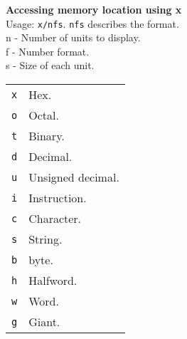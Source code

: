 \textbf{Accessing memory location using x}\\
Usage: \texttt{x/nfs}. \texttt{nfs} describes the format.\\
n - Number of units to display.\\
f - Number format.\\
s - Size of each unit.\\
\begin{tabularx}{\linewidth}{lX}
\hline
\texttt{x} & Hex.\\
\texttt{o} & Octal.\\
\texttt{t} & Binary.\\
\texttt{d} & Decimal.\\
\texttt{u} & Unsigned decimal.\\
\texttt{i} & Instruction.\\
\texttt{c} & Character.\\
\texttt{s} & String.\\
\hline
\texttt{b} & byte.\\
\texttt{h} & Halfword.\\
\texttt{w} & Word.\\
\texttt{g} & Giant.\\
\hline
\end{tabularx}

